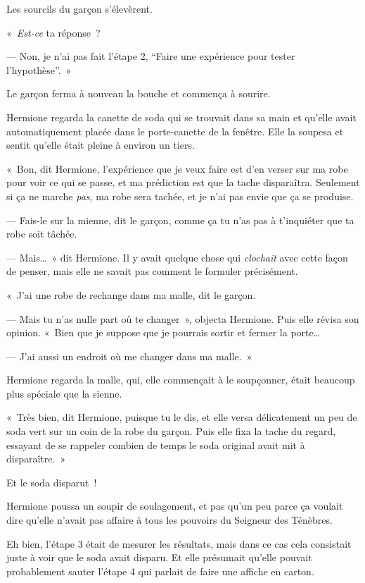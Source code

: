 Les sourcils du garçon s'élevèrent.

«~\emph{Est-ce} ta réponse~?

--- Non, je n'ai pas fait l'étape 2, “Faire une expérience pour tester l'hypothèse”.~»

Le garçon ferma à nouveau la bouche et commença à sourire.

Hermione regarda la canette de soda qui se trouvait dans sa main et qu'elle avait automatiquement placée dans le porte-canette de la fenêtre. Elle la soupesa et sentit qu'elle était pleine à environ un tiers.

«~Bon, dit Hermione, l'expérience que je veux faire est d'en verser sur ma robe pour voir ce qui se passe, et ma prédiction est que la tache disparaîtra. Seulement si ça ne marche \emph{pas}, ma robe sera tachée, et je n'ai pas envie que ça se produise.

--- Fais-le sur la mienne, dit le garçon, comme ça tu n'as pas à t'inquiéter que ta robe soit tâchée.

--- Mais…~» dit Hermione. Il y avait quelque chose qui \emph{clochait} avec cette façon de penser, mais elle ne savait pas comment le formuler précisément.

«~J'ai une robe de rechange dans ma malle, dit le garçon.

--- Mais tu n'as nulle part où te changer~», objecta Hermione. Puis elle révisa son opinion. «~Bien que je suppose que je pourrais sortir et fermer la porte…

--- J'ai aussi un endroit où me changer dans ma malle.~»

Hermione regarda la malle, qui, elle commençait à le soupçonner, était beaucoup plus spéciale que la sienne.

«~Très bien, dit Hermione, puisque tu le dis, et elle versa délicatement un peu de soda vert sur un coin de la robe du garçon. Puis elle fixa la tache du regard, essayant de se rappeler combien de temps le soda original avait mit à disparaître.~»

Et le soda disparut~!

Hermione poussa un soupir de soulagement, et pas qu'un peu parce ça voulait dire qu'elle n'avait pas affaire à tous les pouvoirs du Seigneur des Ténèbres.

Eh bien, l'étape 3 était de mesurer les résultats, mais dans ce cas cela consistait juste à voir que le soda avait disparu. Et elle présumait qu'elle pouvait probablement sauter l'étape 4 qui parlait de faire une affiche en carton.

